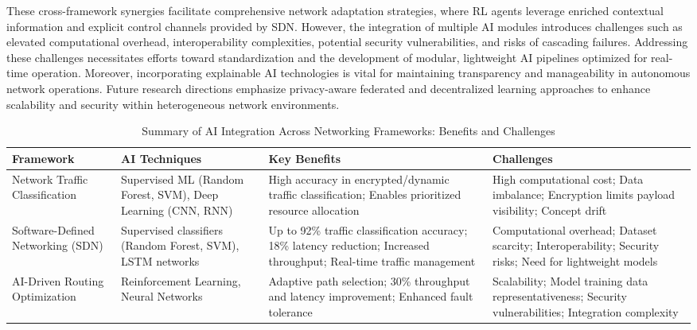 \documentclass[sigconf]{acmart}
\begin{document}
These cross-framework synergies facilitate comprehensive network adaptation strategies, where RL agents leverage enriched contextual information and explicit control channels provided by SDN. However, the integration of multiple AI modules introduces challenges such as elevated computational overhead, interoperability complexities, potential security vulnerabilities, and risks of cascading failures. Addressing these challenges necessitates efforts toward standardization and the development of modular, lightweight AI pipelines optimized for real-time operation. Moreover, incorporating explainable AI technologies is vital for maintaining transparency and manageability in autonomous network operations. Future research directions emphasize privacy-aware federated and decentralized learning approaches to enhance scalability and security within heterogeneous network environments.

\begin{table*}[htbp]
\centering
\caption{Summary of AI Integration Across Networking Frameworks: Benefits and Challenges}
\label{tab:integration_summary}
\begin{adjustbox}{max width=\textwidth}
\begin{tabular}{@{}llll@{}}
\toprule
\textbf{Framework} & \textbf{AI Techniques} & \textbf{Key Benefits} & \textbf{Challenges} \\ \midrule
Network Traffic Classification~\cite{ref51} & Supervised ML (Random Forest, SVM), Deep Learning (CNN, RNN) & 
High accuracy in encrypted/dynamic traffic classification; Enables prioritized resource allocation & 
High computational cost; Data imbalance; Encryption limits payload visibility; Concept drift \\

Software-Defined Networking (SDN)~\cite{ref52} & Supervised classifiers (Random Forest, SVM), LSTM networks & 
Up to 92\% traffic classification accuracy; 18\% latency reduction; Increased throughput; Real-time traffic management & 
Computational overhead; Dataset scarcity; Interoperability; Security risks; Need for lightweight models \\

AI-Driven Routing Optimization~\cite{ref53} & Reinforcement Learning, Neural Networks & 
Adaptive path selection; 30\% throughput and latency improvement; Enhanced fault tolerance & 
Scalability; Model training data representativeness; Security vulnerabilities; Integration complexity \\ \bottomrule
\end{tabular}
\end{adjustbox}
\end{table*}
\end{document}
